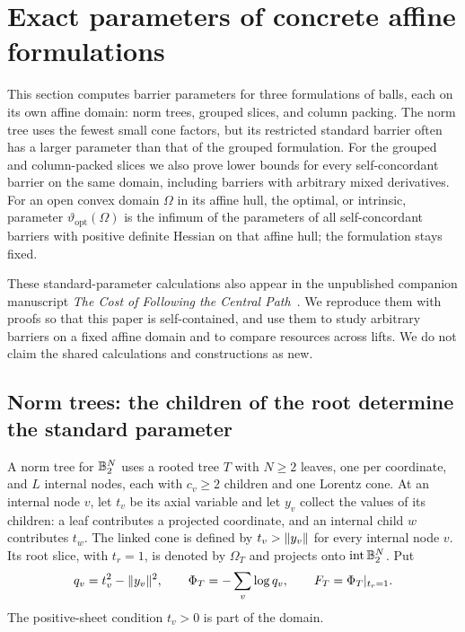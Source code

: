 \section{Exact parameters of concrete affine formulations}
\label{sec:concrete-barriers}

This section computes barrier parameters for three formulations of
balls, each on its own affine domain: norm trees, grouped slices, and
column packing.  The norm tree uses the fewest small cone factors, but
its restricted standard barrier often has a larger parameter than that
of the grouped formulation.  For the grouped and column-packed
slices we also prove lower bounds for every self-concordant barrier on
the same domain, including barriers with arbitrary mixed derivatives.
For an open convex domain $\Omega$ in its affine hull, the optimal, or
intrinsic, parameter $\vartheta_{\mathrm{opt}}(\Omega)$ is the infimum of
the parameters of all self-concordant barriers with positive definite
Hessian on that affine hull; the formulation stays fixed.

These standard-parameter calculations also appear in the unpublished companion manuscript
\emph{The Cost of Following the Central Path}~\citep{CentralPathCompanion}.
We reproduce them with proofs so that this paper is self-contained, and
use them to study arbitrary barriers on a fixed affine domain and to
compare resources across lifts.  We do not claim the shared
calculations and constructions as new.

\subsection{Norm trees: the children of the root determine the standard parameter}

A norm tree for $\mathbb B_2^N$ uses a rooted tree $T$ with $N\geq2$ leaves,
one per coordinate, and $L$ internal nodes, each with $c_v\geq2$
children and one Lorentz cone.  At an internal node $v$, let $t_v$ be its axial
variable and let $y_v$ collect the values of its children: a leaf
contributes a projected coordinate, and an internal child $w$ contributes
$t_w$.  The linked cone is defined by
$t_v>\lVert y_v\rVert$ for every internal node $v$.
Its root slice, with $t_r=1$, is denoted by $\Omega_T$ and projects onto
$\operatorname{int}\mathbb B_2^N$.  Put
\[
 q_v=t_v^2-\lVert y_v\rVert^2,\qquad
 \Phi_T=-\sum_v\log q_v,\qquad F_T=\Phi_T|_{t_r=1}.
\]
The positive-sheet condition $t_v>0$ is part of the domain.

